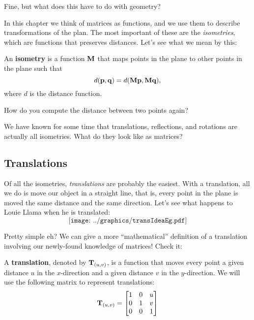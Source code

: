 \begin{question} Fine, but what does this have to do with geometry?
\end{question}

In this chapter we think of matrices as functions, and we use them to 
describe transformations of the plan.  The most important of these 
are the \textit{isometries}, which are functions that preserves
distances. Let's see what we mean by this:

\begin{definition} 
An \textbf{isometry} is
a function $\mathbf{M}$ that maps points in the plane to other points in
the plane such that
\[
d(\mathbf{p}, \mathbf{q}) = d(\mathbf{M} \mathbf{p},\mathbf{M}\mathbf{q}),
\]
where $d$ is the distance function.
\end{definition}


\begin{question}
How do you compute the distance between two points again?
\end{question}
\QM

We have known for some time that 
translations, reflections, and rotations are actually all isometries. 
What do they look like as matrices?  

\subsection{Translations}

Of all the isometries, \textit{translations} are probably the
easiest. With a translation, all we do is move our object in a
straight line, that is, every point in the plane is moved the same
distance and the same direction. Let's see what happens to Louie
Llama when he is translated:
\[
\texttt{[image: ../graphics/transIdeaEg.pdf]}
\]

Pretty simple eh? We can give a more ``mathematical'' definition of a
translation involving our newly-found knowledge of matrices! Check it:

\begin{definition}
A \textbf{translation}, denoted by $\mathbf{T}_{(u,v)}$, is a function
that moves every point a given distance $u$ in the $x$-direction and a
given distance $v$ in the $y$-direction. We will use the following
matrix to represent translations:
\[
\mathbf{T}_{(u,v)} = 
\begin{bmatrix}
1 & 0 & u \\ 
0 & 1 & v \\
0 & 0 & 1
\end{bmatrix}
\]
\end{definition}


